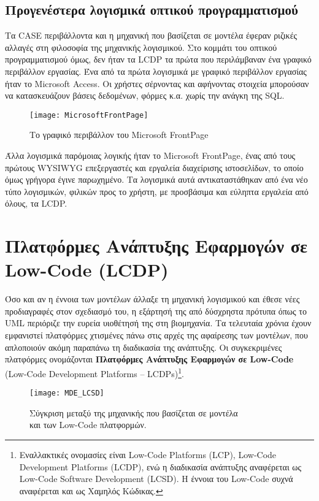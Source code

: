         \subsection{Προγενέστερα λογισμικά οπτικού προγραμματισμού}
            Τα CASE περιβάλλοντα και η μηχανική που βασίζεται σε μοντέλα έφεραν ριζικές αλλαγές στη φιλοσοφία της μηχανικής λογισμικού. Στο κομμάτι του οπτικού προγραμματισμού όμως, δεν ήταν τα LCDP τα πρώτα που περιλάμβαναν ένα γραφικό περιβάλλον εργασίας. Ένα από τα πρώτα λογισμικά με γραφικό περιβάλλον εργασίας ήταν το Microsoft Access. Οι χρήστες σέρνοντας και αφήνοντας στοιχεία μπορούσαν να κατασκευάζουν βάσεις δεδομένων, φόρμες κ.α. χωρίς την ανάγκη της SQL.

            \begin{figure}[h!] \noindent \centering
                    \texttt{[image: MicrosoftFrontPage]}
                    \caption{\centering Το γραφικό περιβάλλον του Microsoft FrontPage}
            \end{figure}

            Άλλα λογισμικά παρόμοιας λογικής ήταν το Microsoft FrontPage, ένας από τους πρώτους WYSIWYG επεξεργαστές και εργαλεία διαχείρισης ιστοσελίδων, το οποίο όμως γρήγορα έγινε παρωχημένο. Τα λογισμικά αυτά αντικαταστάθηκαν από ένα νέο τύπο λογισμικών, φιλικών προς το χρήστη, με προσβάσιμα και εύληπτα εργαλεία από όλους, τα LCDP. \cite{LowCodeSimon}

    \section{Πλατφόρμες Ανάπτυξης Εφαρμογών σε Low-Code (LCDP)}
        Όσο και αν η έννοια των μοντέλων άλλαξε τη μηχανική λογισμικού και έθεσε νέες προδιαγραφές στον σχεδιασμό του, η εξάρτησή της από δύσχρηστα πρότυπα όπως το UML περιόριζε την ευρεία υιοθέτησή της στη βιομηχανία. Τα τελευταία χρόνια έχουν εμφανιστεί πλατφόρμες χτισμένες πάνω στις αρχές της αφαίρεσης των μοντέλων, που απλοποιούν ακόμη παραπάνω τη διαδικασία της ανάπτυξης. Οι συγκεκριμένες πλατφόρμες ονομάζονται \textbf{Πλατφόρμες Ανάπτυξης Εφαρμογών σε Low-Code} (Low-Code Development Platforms -- LCDPs)\footnote{Εναλλακτικές ονομασίες είναι Low-Code Platforms (LCP), Low-Code Development Platforms (LCDP), ενώ η διαδικασία ανάπτυξης αναφέρεται ως Low-Code Software Development (LCSD). Η έννοια του Low-Code συχνά αναφέρεται και ως Χαμηλός Κώδικας.}.\cite{Bock2021}

        \begin{figure}[H] \noindent \centering
                \texttt{[image: MDE\_LCSD]}
                \caption{\centering Σύγκριση μεταξύ της μηχανικής που βασίζεται σε μοντέλα \\ και των Low-Code πλατφορμών. \cite{MDELow}}
        \end{figure}

